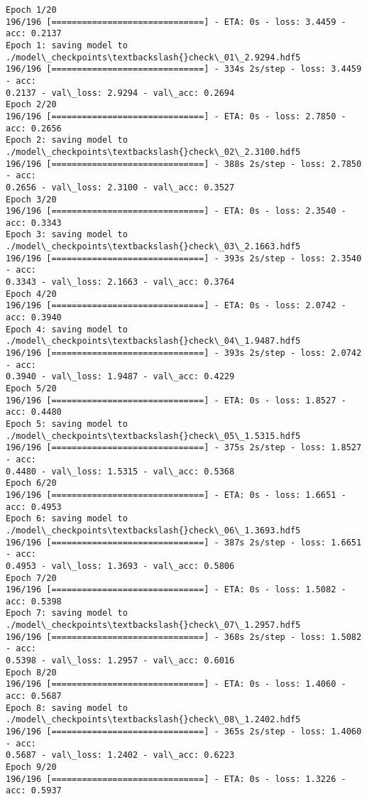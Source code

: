 \documentclass[11pt]{article}
\begin{document}
    \begin{Verbatim}[commandchars=\\\{\}]
Epoch 1/20
196/196 [==============================] - ETA: 0s - loss: 3.4459 - acc: 0.2137
Epoch 1: saving model to ./model\_checkpoints\textbackslash{}check\_01\_2.9294.hdf5
196/196 [==============================] - 334s 2s/step - loss: 3.4459 - acc:
0.2137 - val\_loss: 2.9294 - val\_acc: 0.2694
Epoch 2/20
196/196 [==============================] - ETA: 0s - loss: 2.7850 - acc: 0.2656
Epoch 2: saving model to ./model\_checkpoints\textbackslash{}check\_02\_2.3100.hdf5
196/196 [==============================] - 388s 2s/step - loss: 2.7850 - acc:
0.2656 - val\_loss: 2.3100 - val\_acc: 0.3527
Epoch 3/20
196/196 [==============================] - ETA: 0s - loss: 2.3540 - acc: 0.3343
Epoch 3: saving model to ./model\_checkpoints\textbackslash{}check\_03\_2.1663.hdf5
196/196 [==============================] - 393s 2s/step - loss: 2.3540 - acc:
0.3343 - val\_loss: 2.1663 - val\_acc: 0.3764
Epoch 4/20
196/196 [==============================] - ETA: 0s - loss: 2.0742 - acc: 0.3940
Epoch 4: saving model to ./model\_checkpoints\textbackslash{}check\_04\_1.9487.hdf5
196/196 [==============================] - 393s 2s/step - loss: 2.0742 - acc:
0.3940 - val\_loss: 1.9487 - val\_acc: 0.4229
Epoch 5/20
196/196 [==============================] - ETA: 0s - loss: 1.8527 - acc: 0.4480
Epoch 5: saving model to ./model\_checkpoints\textbackslash{}check\_05\_1.5315.hdf5
196/196 [==============================] - 375s 2s/step - loss: 1.8527 - acc:
0.4480 - val\_loss: 1.5315 - val\_acc: 0.5368
Epoch 6/20
196/196 [==============================] - ETA: 0s - loss: 1.6651 - acc: 0.4953
Epoch 6: saving model to ./model\_checkpoints\textbackslash{}check\_06\_1.3693.hdf5
196/196 [==============================] - 387s 2s/step - loss: 1.6651 - acc:
0.4953 - val\_loss: 1.3693 - val\_acc: 0.5806
Epoch 7/20
196/196 [==============================] - ETA: 0s - loss: 1.5082 - acc: 0.5398
Epoch 7: saving model to ./model\_checkpoints\textbackslash{}check\_07\_1.2957.hdf5
196/196 [==============================] - 368s 2s/step - loss: 1.5082 - acc:
0.5398 - val\_loss: 1.2957 - val\_acc: 0.6016
Epoch 8/20
196/196 [==============================] - ETA: 0s - loss: 1.4060 - acc: 0.5687
Epoch 8: saving model to ./model\_checkpoints\textbackslash{}check\_08\_1.2402.hdf5
196/196 [==============================] - 365s 2s/step - loss: 1.4060 - acc:
0.5687 - val\_loss: 1.2402 - val\_acc: 0.6223
Epoch 9/20
196/196 [==============================] - ETA: 0s - loss: 1.3226 - acc: 0.5937

\end{Verbatim}
\end{document}
